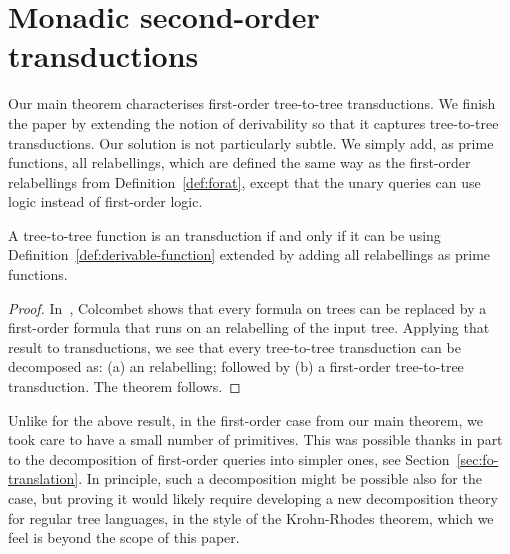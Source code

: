 \section{Monadic second-order transductions}
\label{sec:mso-trans}
Our main theorem characterises first-order tree-to-tree transductions. We finish the paper by extending the notion of derivability so that it captures  \mso tree-to-tree transductions. 
Our solution is not particularly subtle. We simply add, as prime functions, all \mso relabellings, which are defined the  same way as the first-order relabellings from Definition~\ref{def:forat}, except that the unary queries can use \mso logic instead of first-order logic. 

\begin{theorem}\label{thm:mso-transductions}
    A tree-to-tree function is an \mso  transduction if and only if it can be using  Definition~\ref{def:derivable-function}  extended by  adding  all \mso relabellings as prime functions. 
\end{theorem}
\begin{proof}
    In~\cite[Corollary 1]{colcombetCombinatorialTheoremTrees2007}, Colcombet shows that every \mso formula on trees can be replaced by a first-order formula that runs on an \mso relabelling of the input tree. Applying that result to transductions, we see that every \mso tree-to-tree transduction can be decomposed as: (a) an \mso relabelling; followed by (b) a first-order tree-to-tree transduction.  The theorem follows.
\end{proof}
Unlike for the  above result,   in the first-order case from our main theorem, we took care to have a small number of primitives. This  was possible thanks in part to the decomposition of first-order queries into simpler ones, see Section~\ref{sec:fo-translation}.  In principle, such a decomposition might be possible also for the \mso case, but proving it  would likely require developing a new decomposition  theory for regular tree languages, in the style of the Krohn-Rhodes theorem, which we feel is beyond the scope of this paper. 



